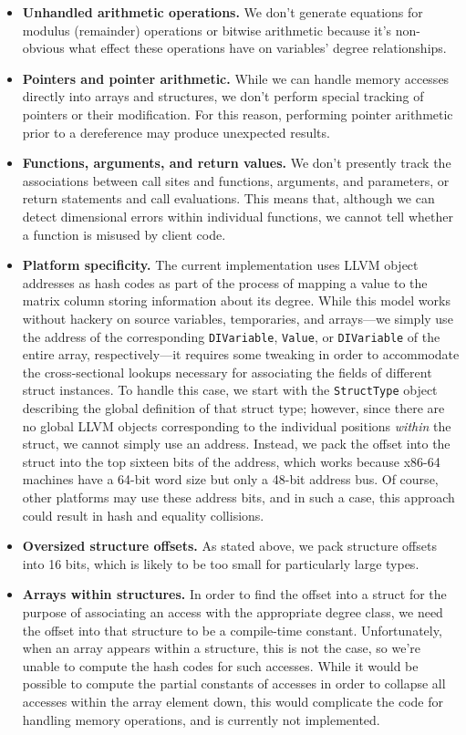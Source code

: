 \documentclass[12pt]{article}
\begin{document}
\begin{itemize}
\item \textbf{Unhandled arithmetic operations.}
We don't generate equations for modulus (remainder) operations or bitwise arithmetic because it's non-obvious what effect these operations have on variables' degree relationships.

\item \textbf{Pointers and pointer arithmetic.}
While we can handle memory accesses directly into arrays and structures, we don't perform special tracking of pointers or their modification.
For this reason, performing pointer arithmetic prior to a dereference may produce unexpected results.

\item \textbf{Functions, arguments, and return values.}
We don't presently track the associations between call sites and functions, arguments, and parameters, or return statements and call evaluations.
This means that, although we can detect dimensional errors within individual functions, we cannot tell whether a function is misused by client code.

\item \textbf{Platform specificity.}
The current implementation uses LLVM object addresses as hash codes as part of the process of mapping a value to the matrix column storing information about its degree.
While this model works without hackery on source variables, temporaries, and arrays---we simply use the address of the corresponding \texttt{DIVariable}, \texttt{Value}, or \texttt{DIVariable} of the entire array, respectively---it requires some tweaking in order to accommodate the cross-sectional lookups necessary for associating the fields of different struct instances.
To handle this case, we start with the \texttt{StructType} object describing the global definition of that struct type; however, since there are no global LLVM objects corresponding to the individual positions \textit{within} the struct, we cannot simply use an address.
Instead, we pack the offset into the struct into the top sixteen bits of the address, which works because x86-64 machines have a 64-bit word size but only a 48-bit address bus.
Of course, other platforms may use these address bits, and in such a case, this approach could result in hash and equality collisions.

\item \textbf{Oversized structure offsets.}
As stated above, we pack structure offsets into 16 bits, which is likely to be too small for particularly large types.

\item \textbf{Arrays within structures.}
In order to find the offset into a struct for the purpose of associating an access with the appropriate degree class, we need the offset into that structure to be a compile-time constant.
Unfortunately, when an array appears within a structure, this is not the case, so we're unable to compute the hash codes for such accesses.
While it would be possible to compute the partial constants of accesses in order to collapse all accesses within the array element down, this would complicate the code for handling memory operations, and is currently not implemented.
\end{itemize}
\end{document}
